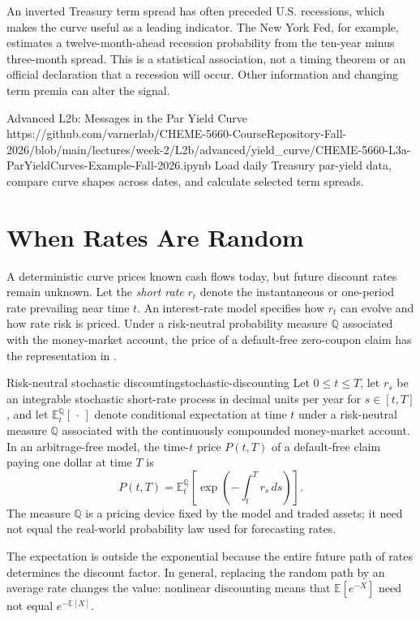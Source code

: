 \documentclass[11pt]{article}
\newcommand{\Q}{\mathbb{Q}}
\newcommand{\E}{\mathbb{E}}
\begin{document}
An inverted Treasury term spread has often preceded U.S. recessions, which makes the curve useful as a leading indicator. The New York Fed, for example, estimates a twelve-month-ahead recession probability from the ten-year minus three-month spread. This is a statistical association, not a timing theorem or an official declaration that a recession will occur. Other information and changing term premia can alter the signal.

\notebooklink
  {Advanced L2b: Messages in the Par Yield Curve}
  {https://github.com/varnerlab/CHEME-5660-CourseRepository-Fall-2026/blob/main/lectures/week-2/L2b/advanced/yield_curve/CHEME-5660-L3a-ParYieldCurves-Example-Fall-2026.ipynb}
  {Load daily Treasury par-yield data, compare curve shapes across dates, and calculate selected term spreads.}

\section{When Rates Are Random}

A deterministic curve prices known cash flows today, but future discount rates remain unknown. Let the \emph{short rate} $r_t$ denote the instantaneous or one-period rate prevailing near time $t$. An interest-rate model specifies how $r_t$ can evolve and how rate risk is priced. Under a risk-neutral probability measure $\Q$ associated with the money-market account, the price of a default-free zero-coupon claim has the representation in .

\begin{theorem}{Risk-neutral stochastic discounting}{stochastic-discounting}
Let $0\leq t\leq T$, let $r_s$ be an integrable stochastic short-rate process in decimal units per year for $s\in[t,T]$, and let $\E_t^{\Q}[\,\cdot\,]$ denote conditional expectation at time $t$ under a risk-neutral measure $\Q$ associated with the continuously compounded money-market account. In an arbitrage-free model, the time-$t$ price $P(t,T)$ of a default-free claim paying one dollar at time $T$ is
\begin{equation}
  \label{eq:stochastic-discounting}
  P(t,T)=\E_t^{\Q}\!\left[\exp\!\left(-\int_t^T r_s\,ds\right)\right].
\end{equation}
The measure $\Q$ is a pricing device fixed by the model and traded assets; it need not equal the real-world probability law used for forecasting rates.
\end{theorem}

The expectation is outside the exponential because the entire future path of rates determines the discount factor. In general, replacing the random path by an average rate changes the value: nonlinear discounting means that $\E[e^{-X}]$ need not equal $e^{-\E[X]}$.
\end{document}
